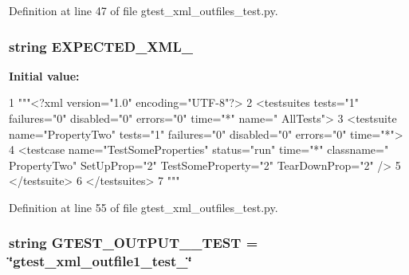 \-Definition at line 47 of file gtest\-\_\-xml\-\_\-outfiles\-\_\-test.\-py.

\hypertarget{namespacegtest__xml__outfiles__test_a723b479d04668dcf21644908dda0cbcb}{
\subsubsection[{\-E\-X\-P\-E\-C\-T\-E\-D\-\_\-\-X\-M\-L\-\_\-2}]{\setlength{\rightskip}{0pt plus 5cm}string {\bf \-E\-X\-P\-E\-C\-T\-E\-D\-\_\-\-X\-M\-L\-\_}}}\label{da/d3e/namespacegtest__xml__outfiles__test_a723b479d04668dcf21644908dda0cbcb}
{\bfseries \-Initial value\-:}
\begin{DoxyCode}
1 """<?xml version="1.0" encoding="UTF-8"?>
2 <testsuites tests="1" failures="0" disabled="0" errors="0" time="*" name="
      AllTests">
3   <testsuite name="PropertyTwo" tests="1" failures="0" disabled="0" errors="0"
       time="*">
4     <testcase name="TestSomeProperties" status="run" time="*" classname="
      PropertyTwo" SetUpProp="2" TestSomeProperty="2" TearDownProp="2" />
5   </testsuite>
6 </testsuites>
7 """
\end{DoxyCode}


\-Definition at line 55 of file gtest\-\_\-xml\-\_\-outfiles\-\_\-test.\-py.

\hypertarget{namespacegtest__xml__outfiles__test_a332e048f25932ea58e027939a71cc501}{
\subsubsection[{\-G\-T\-E\-S\-T\-\_\-\-O\-U\-T\-P\-U\-T\-\_\-1\-\_\-\-T\-E\-S\-T}]{\setlength{\rightskip}{0pt plus 5cm}string {\bf \-G\-T\-E\-S\-T\-\_\-\-O\-U\-T\-P\-U\-T\-\_\-\_\-\-T\-E\-S\-T} = \char`\"{}gtest\-\_\-xml\-\_\-outfile1\-\_\-test\-\_\-\char`\"{}}}\label{da/d3e/namespacegtest__xml__outfiles__test_a332e048f25932ea58e027939a71cc501}


